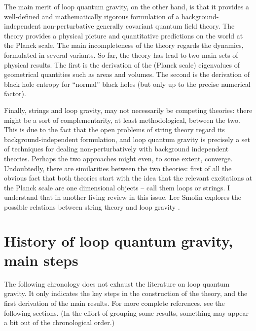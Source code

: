\documentclass[12pt]{article}
\begin{document}
The main merit of loop quantum gravity, on the other hand, is 
that it provides a well-defined and mathematically rigorous 
formulation of a background-independent non-perturbative 
generally covariant quantum field theory.  The theory provides a 
physical picture and quantitative predictions on the world 
at the Planck scale.  The main incompleteness of the theory 
regards the dynamics, formulated in several variants.  So far, 
the theory has lead to two main sets of physical results.  The 
first is the derivation of the (Planck scale) eigenvalues of 
geometrical quantities such as areas and volumes. The second is
the derivation of black hole entropy for ``normal'' black holes 
(but only up to the precise numerical factor).  

Finally, strings and loop gravity, may not necessarily be competing 
theories: there might be a sort of complementarity, at least 
methodological, between the two.  This is due to the fact that the 
open problems of string theory regard its background-independent 
formulation, and loop quantum gravity is precisely a set of techniques 
for dealing non-perturbatively with background independent theories.  
Perhaps the two approaches might even, to some extent, converge.  
Undoubtedly, there are similarities between the two theories: first of 
all the obvious fact that both theories start with the idea that the 
relevant excitations at the Planck scale are one dimensional objects 
-- call them loops or strings.  I understand that in another living 
review in this issue, Lee Smolin explores the possible relations 
between string theory and loop gravity \cite{Smolin97}.

\section{History of loop quantum gravity, main steps}\label{3}

The following chronology does not exhaust the literature on loop 
quantum gravity.  It only indicates the key steps in the construction 
of the theory, and the first derivation of the main results.  For more 
complete references, see the following sections.  (In the effort 
of grouping some results, something may appear a bit out of the 
chronological order.) 
\end{document}
